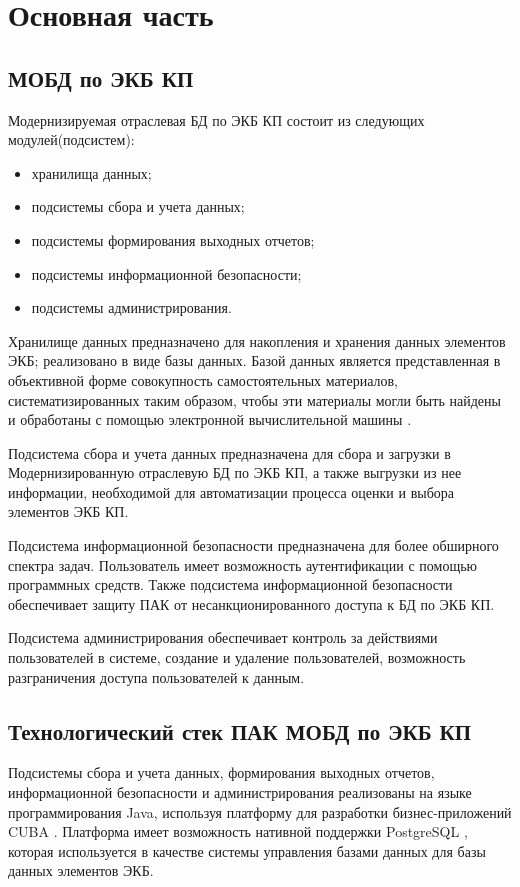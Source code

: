 \chapter{Основная часть}
\section{МОБД по ЭКБ КП}
Модернизируемая отраслевая БД по ЭКБ КП состоит из следующих модулей(подсистем):
\begin{itemize}
	\item хранилища данных;
	\item подсистемы сбора и учета данных;
	\item подсистемы формирования выходных отчетов;
	\item подсистемы информационной безопасности;
	\item подсистемы администрирования.
\end{itemize}
Хранилище данных предназначено для накопления и хранения данных элементов ЭКБ; реализовано в виде базы данных. Базой данных является представленная в объективной форме совокупность самостоятельных материалов, систематизированных таким образом, чтобы эти материалы могли быть найдены и обработаны с помощью электронной вычислительной машины \cite{bd}. 

Подсистема сбора и учета данных предназначена для сбора и загрузки в Модернизированную отраслевую БД по ЭКБ КП, а также выгрузки из нее информации, необходимой для автоматизации процесса оценки и выбора элементов ЭКБ КП. 

Подсистема информационной безопасности предназначена для более обширного спектра задач. Пользователь имеет возможность аутентификации с помощью программных средств. Также подсистема информационной безопасности обеспечивает защиту ПАК от несанкционированного доступа к БД по ЭКБ КП.

Подсистема администрирования обеспечивает контроль за действиями пользователей в системе, создание и удаление пользователей, возможность разграничения доступа  пользователей к данным.

\section{Технологический стек ПАК МОБД по ЭКБ КП}
Подсистемы сбора и учета данных, формирования выходных отчетов, информационной безопасности и администрирования реализованы на языке программирования Java, используя платформу для разработки бизнес-приложений CUBA \cite{cuba}. 
Платформа имеет возможность нативной поддержки PostgreSQL \cite{psql}, которая используется в качестве системы управления базами данных для базы данных элементов ЭКБ.

